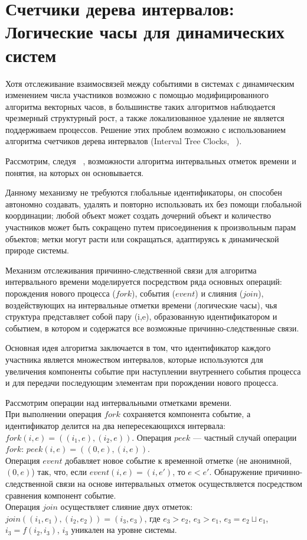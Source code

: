 \section{Счетчики дерева интервалов: Логические часы для динамических систем}
Хотя отслеживание взаимосвязей между событиями в системах с динамическим изменением числа участников возможно с помощью модифицированного алгоритма векторных часов, в большинстве таких алгоритмов наблюдается чрезмерный структурный рост, а также локализованное удаление не является поддерживаем процессов. Решение этих проблем возможно с использованием алгоритма счетчиков дерева интервалов (Interval Tree Clocks, ~\cite{itc_article}).

Рассмотрим, следуя ~\cite{itc_article}, возможности алгоритма интервальных отметок времени и понятия, на которых он основывается.

Данному механизму не требуются глобальные идентификаторы, он способен автономно создавать, удалять и повторно использовать их без помощи глобальной координации; любой объект может создать дочерний объект и количество участников может быть сокращено путем присоединения к произвольным парам объектов; метки могут расти или сокращаться, адаптируясь к динамической природе системы.

Механизм отслеживания причинно-следственной связи для алгоритма интервального времени моделируется посредством ряда основных операций: порождения нового процесса ($fork$), события ($event$) и слияния ($join$), воздействующих на интервальные отметки времени (логические часы), чья структура представляет собой пару (i,e), образованную идентификатором и событием, в котором и содержатся все возможные причинно-следственные связи.

Основная идея алгоритма заключается в том, что идентификатор каждого участника является множеством интервалов, которые используются для увеличения компоненты событие при наступлении внутреннего события процесса и для передачи последующим элементам при порождении нового процесса.

Рассмотрим операции над интервальными отметками времени.\\
При выполнении операция $fork$ сохраняется компонента событие, а идентификатор делится на два непересекающихся интервала: $fork(i,e) = ((i_1,e),(i_2,e))$.  
Операция $peek$ --- частный случай операции $fork$: $peek(i,e)=((0,e),(i,e))$.\\
Операция $event$ добавляет новое событие к временной отметке (не анонимной, $(0,e)$) так, что, если $event(i,e) = (i,e')$, то $e < e'$. 
Обнаружение причинно-следственной связи на основе интервальных отметок осуществляется посредством сравнения компонент событие.\\
Операция $join$ осуществляет слияние двух отметок: $join((i_1,e_1),(i_2,e_2)) = (i_3,e_3)$, где
$e_3 > e_2$, $e_3 > e_1$, $e_3 = e_2 \sqcup e_1$, $i_3 = f(i_2,i_3)$, $i_3$ уникален на уровне системы.

